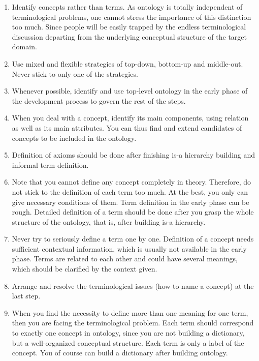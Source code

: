 \begin{enumerate}
\item Identify concepts rather than terms. As ontology is totally independent of terminological problems, one cannot stress the importance of this distinction too much. Since people will be easily trapped by the endless terminological discussion departing from the underlying conceptual structure of the target domain.

\item Use mixed and flexible strategies of top-down, bottom-up and middle-out. Never stick to only one of the strategies. 

\item Whenever possible, identify and use top-level ontology in the early phase of the development process to govern the rest of the steps. 

\item When you deal with a concept, identify its main components, using  relation as well as its main attributes. You can thus find and extend candidates of concepts to be included in the ontology. 

\item Definition of axioms should be done after finishing is-a hierarchy building and informal term definition. 

\item Note that you cannot define any concept completely in theory. Therefore, do not stick to the definition of each term too much. At the best, you only can give necessary conditions of them. Term definition in the early phase can be rough. Detailed definition of a term should be done after you grasp the whole structure of the ontology, that is, after building is-a hierarchy. 

\item Never try to seriously define a term one by one. Definition of a concept needs sufficient contextual information, which is usually not available in the early phase. Terms are related to each other and could have several meanings, which should be clarified by the context given. 

\item Arrange and resolve the terminological issues (how to name a concept) at the last step. 

\item When you find the necessity to define more than one meaning for one term, then you are facing the terminological problem. Each term should correspond to exactly one concept in ontology, since you are not building a dictionary, but a well-organized conceptual structure. Each term is only a label of the concept. You of course can build a dictionary after building ontology.


\end{enumerate}
